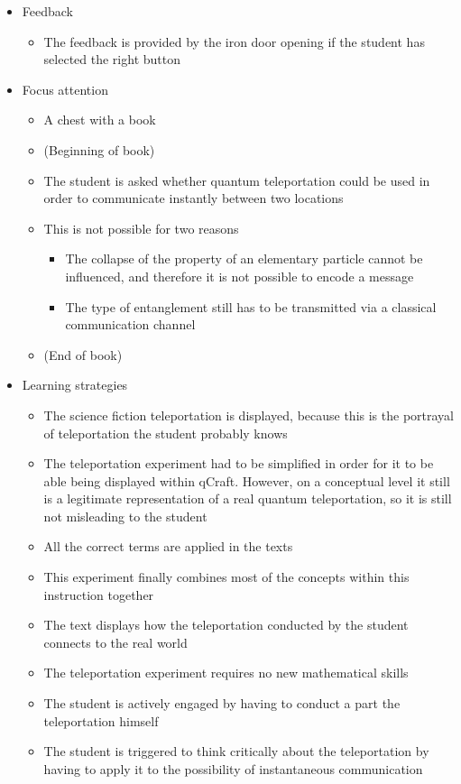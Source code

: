 \documentclass[11pt,twoside]{report} %
\begin{document}
\begin{itemize}
\begin{itemize}
	\end{itemize}
	\item Feedback
	\begin{itemize}
		\item The feedback is provided by the iron door opening if the student has selected the right button
	\end{itemize}
	\item Focus attention
	\begin{itemize}
		\item A chest with a book
		\item (Beginning of book)
		\item The student is asked whether quantum teleportation could be used in order to communicate instantly between two locations
		\item This is not possible for two reasons
		\begin{itemize}
			\item The collapse of the property of an elementary particle cannot be influenced, and therefore it is not possible to encode a message
			\item The type of entanglement still has to be transmitted via a classical communication channel
		\end{itemize}
		\item (End of book)
	\end{itemize}
	\item Learning strategies
	\begin{itemize}
		\item The science fiction teleportation is displayed, because this is the portrayal of teleportation the student probably knows
		\item The teleportation experiment had to be simplified in order for it to be able being displayed within qCraft. However, on a conceptual level it still is a legitimate representation of a real quantum teleportation, so it is still not misleading to the student
		\item All the correct terms are applied in the texts
		\item This experiment finally combines most of the concepts within this instruction together
		\item The text displays how the teleportation conducted by the student connects to the real world
		\item The teleportation experiment requires no new mathematical skills
		\item The student is actively engaged by having to conduct a part the teleportation himself
		\item The student is triggered to think critically about the teleportation by having to apply it to the possibility of instantaneous communication
	\end{itemize}
\end{itemize}
\end{document}
